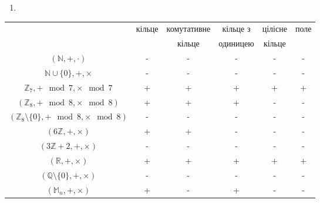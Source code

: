 \documentclass[a4paper,12pt]{article}
\begin{document}
\begin{justify}
\begin{enumerate}
\begin{enumerate}
 			\end{enumerate}
 			\item 
 		\end{enumerate}
 		\begin{table}[htp]\centering
\begin{tabular}{|c|c|c|c|c|c|}
\hline
\multirow{2}{*}{}                                 & кільце & комутативне & кільце з & цілісне & поле \\
                                                  &        & кільце      & одиницею & кільце  &      \\ \hline
$(\mathbb{N},+,\cdot)$                            & -      & -           & -        & -       & -    \\ \hline
$\mathbb{N}\cup\{0\},+,\times$                    & -      & -           & -        & -       & -    \\ \hline
$\mathbb{Z}_7,+\mod7,\times\mod7$                 & +      & +           & +        & +       & +    \\ \hline
$(\mathbb{Z}_8,+\mod8,\times\mod8)$               & +      & +           & +        & -       & -    \\ \hline
$(\mathbb{Z}_8\setminus\{0\},+\mod8,\times\mod8)$ & -      & -           & -        & -       & -    \\ \hline
$(6\mathbb{Z},+,\times)$                          & +      & +           & -        & -       & -    \\ \hline
$(3\mathbb{Z}+2,+,\times)$                        & -      & -           & -        & -       & -    \\ \hline
$(\mathbb{R},+,\times)$                           & +      & +           & +        & +       & +    \\ \hline
$(\mathbb{Q}\setminus\{0\},+,\times)$             & -      & -           & -        & -       & -    \\ \hline
$(\mathbb{M}_n,+,\times)$                         & +      & -           & +        & -       & -    \\ \hline
\end{tabular}
\end{table}
	\end{justify}
\end{document}

